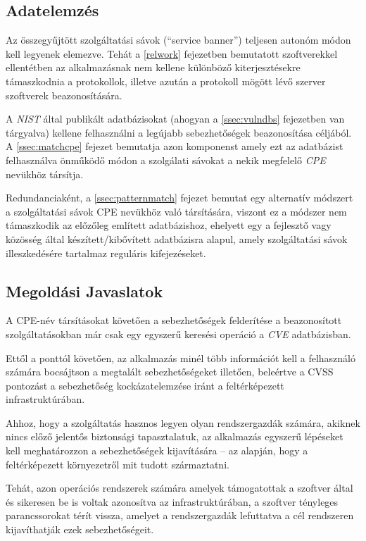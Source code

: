 \documentclass[a4paper,12pt]{article}
\begin{document}
\subsection{Adatelemzés}

	Az összegyűjtött szolgáltatási sávok (``service banner'') teljesen autonóm módon kell legyenek elemezve. Tehát a \ref{relwork} fejezetben bemutatott szoftverekkel ellentétben az alkalmazásnak nem kellene különböző kiterjesztésekre támaszkodnia a protokollok, illetve azután a protokoll mögött lévő szerver szoftverek beazonosítására.

	A \textit{NIST} által publikált adatbázisokat (ahogyan a \ref{ssec:vulndbs} fejezetben van tárgyalva) kellene felhasználni a legújabb sebezhetőségek beazonosítása céljából. A \ref{ssec:matchcpe} fejezet bemutatja azon komponenst amely ezt az adatbázist felhasználva önműködő módon a szolgálati sávokat a nekik megfelelő \textit{CPE} nevükhöz társítja.

	Redundanciaként, a \ref{ssec:patternmatch} fejezet bemutat egy alternatív módszert a szolgáltatási sávok CPE nevükhöz való társítására, viszont ez a módszer nem támaszkodik az előzőleg említett adatbázishoz, ehelyett egy a fejlesztő vagy közösség által készített/kibővített adatbázisra alapul, amely szolgáltatási sávok illeszkedésére tartalmaz reguláris kifejezéseket.

\subsection{Megoldási Javaslatok}

	A CPE-név társításokat követően a sebezhetőségek felderítése a beazonosított szolgáltatásokban már csak egy egyszerű keresési operáció a \textit{CVE} adatbázisban.
	
	Ettől a ponttól követően, az alkalmazás minél több információt kell a felhasználó számára bocsájtson a megtalált sebezhetőségeket illetően, beleértve a CVSS pontozást a sebezhetőség kockázatelemzése iránt a feltérképezett infrastruktúrában.

	Ahhoz, hogy a szolgáltatás hasznos legyen olyan rendszergazdák számára, akiknek nincs előző jelentős biztonsági tapasztalatuk, az alkalmazás egyszerű lépéseket kell meghatározzon a sebezhetőségek kijavítására -- az alapján, hogy a feltérképezett környezetről mit tudott származtatni.

	Tehát, azon operációs rendszerek számára amelyek támogatottak a szoftver által és sikeresen be is voltak azonosítva az infrastruktúrában, a szoftver tényleges parancssorokat térít vissza, amelyet a rendszergazdák lefuttatva a cél rendszeren kijavíthatják ezek sebezhetőségeit.
	
\end{document}
